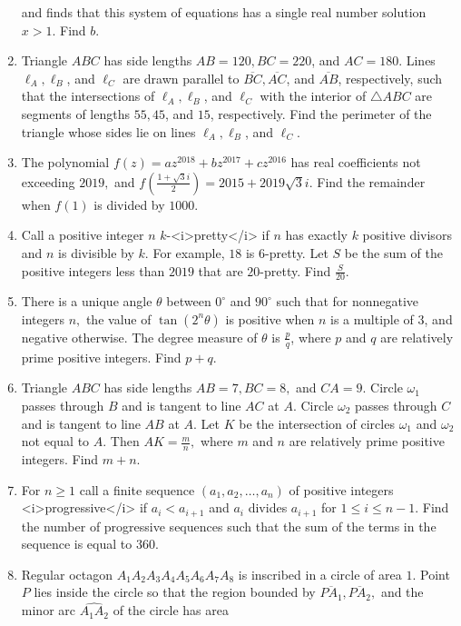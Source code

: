 \documentclass{article}
\begin{document}
\begin{enumerate}[label=\arabic*., itemsep=0.5em]
and finds that this system of equations has a single real number solution $x>1$. Find $b$.\par \vspace{0.5em}\item Triangle $ABC$ has side lengths $AB=120,BC=220$, and $AC=180$. Lines $\ell_A,\ell_B$, and $\ell_C$ are drawn parallel to $\overline{BC},\overline{AC}$, and $\overline{AB}$, respectively, such that the intersections of $\ell_A,\ell_B$, and $\ell_C$ with the interior of $\triangle ABC$ are segments of lengths $55,45$, and $15$, respectively. Find the perimeter of the triangle whose sides lie on lines $\ell_A,\ell_B$, and $\ell_C$.\par \vspace{0.5em}\item The polynomial $f(z)=az^{2018}+bz^{2017}+cz^{2016}$ has real coefficients not exceeding $2019,$ and $f\left(\tfrac{1+\sqrt3i}{2}\right)=2015+2019\sqrt3i$. Find the remainder when $f(1)$ is divided by $1000$.\par \vspace{0.5em}\item Call a positive integer $n$ $k$-<i>pretty</i> if $n$ has exactly $k$ positive divisors and $n$ is divisible by $k$. For example, $18$ is $6$-pretty. Let $S$ be the sum of the positive integers less than $2019$ that are $20$-pretty. Find $\tfrac{S}{20}$.\par \vspace{0.5em}\item There is a unique angle $\theta$ between $0^\circ$ and $90^\circ$ such that for nonnegative integers $n,$ the value of $\tan(2^n\theta)$ is positive when $n$ is a multiple of $3$, and negative otherwise. The degree measure of $\theta$ is $\tfrac{p}{q}$, where $p$ and $q$ are relatively prime positive integers. Find $p+q$.\par \vspace{0.5em}\item Triangle $ABC$ has side lengths $AB=7,BC=8,$ and $CA=9.$ Circle $\omega_1$ passes through $B$ and is tangent to line $AC$ at $A.$ Circle $\omega_2$ passes through $C$ and is tangent to line $AB$ at $A.$ Let $K$ be the intersection of circles $\omega_1$ and $\omega_2$ not equal to $A.$ Then $AK=\tfrac{m}{n},$ where $m$ and $n$ are relatively prime positive integers. Find $m+n.$\par \vspace{0.5em}\item For $n\ge1$ call a finite sequence $(a_1,a_2,\ldots,a_n)$ of positive integers <i>progressive</i> if $a_i<a_{i+1}$ and $a_i$ divides $a_{i+1}$ for $1\le i\le n-1$. Find the number of progressive sequences such that the sum of the terms in the sequence is equal to $360.$\par \vspace{0.5em}\item Regular octagon $A_1A_2A_3A_4A_5A_6A_7A_8$ is inscribed in a circle of area $1.$ Point $P$ lies inside the circle so that the region bounded by $\overline{PA_1},\overline{PA_2},$ and the minor arc $\widehat{A_1A_2}$ of the circle has area 
\end{enumerate}
\end{document}
